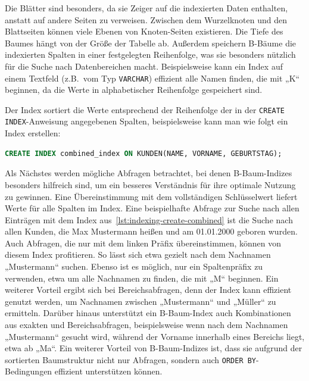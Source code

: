Die Blätter sind besonders, da sie Zeiger auf die indexierten Daten enthalten, anstatt auf andere Seiten zu verweisen.
Zwischen dem Wurzelknoten und den Blattseiten können viele Ebenen von Knoten-Seiten existieren.
Die Tiefe des Baumes hängt von der Größe der Tabelle ab.
Außerdem speichern B-Bäume die indexierten Spalten in einer festgelegten Reihenfolge, was sie besonders nützlich für die Suche nach Datenbereichen macht.
Beispielsweise kann ein Index auf einem Textfeld (z.B.\ vom Typ \texttt{VARCHAR}) effizient alle Namen finden, die mit „K“ beginnen, da die Werte in alphabetischer Reihenfolge gespeichert sind.

Der Index sortiert die Werte entsprechend der Reihenfolge der in der \texttt{CREATE INDEX}-Anweisung angegebenen Spalten, beispielsweise kann man wie folgt ein Index erstellen:

\vspace{-5pt}
\begin{lstlisting}[language=SQL,caption=B-Baum-Index bestehend aus mehreren Attributen,label={lst:indexing-create-combined}]
CREATE INDEX combined_index ON KUNDEN(NAME, VORNAME, GEBURTSTAG);
\end{lstlisting}
\vspace{-8pt}

Als Nächstes werden mögliche Abfragen betrachtet, bei denen B-Baum-Indizes besonders hilfreich sind, um ein besseres Verständnis für ihre optimale Nutzung zu gewinnen.
Eine Übereinstimmung mit dem vollständigen Schlüsselwert liefert Werte für alle Spalten im Index.
Eine beispielhafte Abfrage zur Suche nach allen Einträgen mit dem Index aus~\ref{lst:indexing-create-combined} ist die Suche nach allen Kunden, die Max Mustermann heißen und am 01.01.2000 geboren wurden.
Auch Abfragen, die nur mit dem linken Präfix übereinstimmen, können von diesem Index profitieren.
So lässt sich etwa gezielt nach dem Nachnamen „Mustermann“ suchen.
Ebenso ist es möglich, nur ein Spaltenpräfix zu verwenden, etwa um alle Nachnamen zu finden, die mit „M“ beginnen.
Ein weiterer Vorteil ergibt sich bei Bereichsabfragen, denn der Index kann effizient genutzt werden, um Nachnamen zwischen „Mustermann“ und „Müller“ zu ermitteln.
Darüber hinaus unterstützt ein B-Baum-Index auch Kombinationen aus exakten und Bereichsabfragen, beispielsweise wenn nach dem Nachnamen „Mustermann“ gesucht wird, während der Vorname innerhalb eines Bereichs liegt, etwa ab „Ma“.
Ein weiterer Vorteil von B-Baum-Indizes ist, dass sie aufgrund der sortierten Baumstruktur nicht nur Abfragen, sondern auch \texttt{ORDER BY}-Bedingungen effizient unterstützen können.

